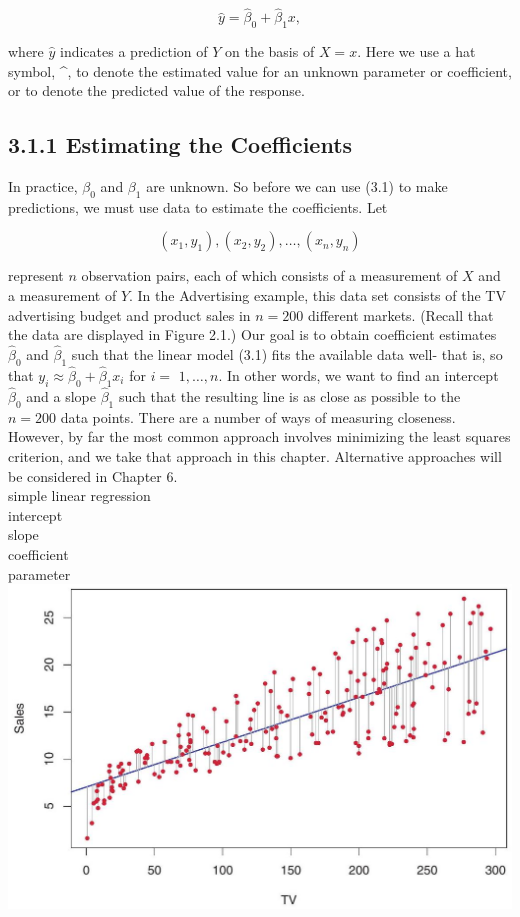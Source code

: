 \documentclass[10pt]{article}
\begin{document}
\begin{equation*}
\hat{y}=\hat{\beta}_{0}+\hat{\beta}_{1} x, \tag{3.2}
\end{equation*}


where $\hat{y}$ indicates a prediction of $Y$ on the basis of $X=x$. Here we use a hat symbol, \^{}, to denote the estimated value for an unknown parameter or coefficient, or to denote the predicted value of the response.

\subsection*{3.1.1 Estimating the Coefficients}
In practice, $\beta_{0}$ and $\beta_{1}$ are unknown. So before we can use (3.1) to make predictions, we must use data to estimate the coefficients. Let

$$
\left(x_{1}, y_{1}\right),\left(x_{2}, y_{2}\right), \ldots,\left(x_{n}, y_{n}\right)
$$

represent $n$ observation pairs, each of which consists of a measurement of $X$ and a measurement of $Y$. In the Advertising example, this data set consists of the TV advertising budget and product sales in $n=200$ different markets. (Recall that the data are displayed in Figure 2.1.) Our goal is to obtain coefficient estimates $\hat{\beta}_{0}$ and $\hat{\beta}_{1}$ such that the linear model (3.1) fits the available data well- that is, so that $y_{i} \approx \hat{\beta}_{0}+\hat{\beta}_{1} x_{i}$ for $i=$ $1, \ldots, n$. In other words, we want to find an intercept $\hat{\beta}_{0}$ and a slope $\hat{\beta}_{1}$ such that the resulting line is as close as possible to the $n=200$ data points. There are a number of ways of measuring closeness. However, by far the most common approach involves minimizing the least squares criterion, and we take that approach in this chapter. Alternative approaches will be considered in Chapter 6.\\
simple linear regression\\
intercept\\
slope\\
coefficient\\
parameter\\
\includegraphics[max width=\textwidth, center]{2025_05_05_efe77898333945044de4g-077}
\end{document}
